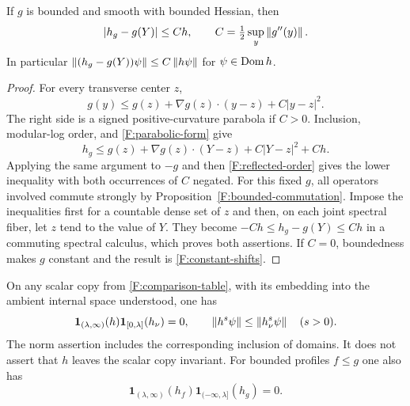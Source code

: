 \begin{lemma}\label{F:taylor-bound}
If $g$ is bounded and smooth with bounded Hessian, then
\begin{equation}\label{F:taylor-equation}
 |h_g-g(Y)|\le C h,\qquad
 C=\tfrac12\sup_y\left\lVert g''(y)\right\rVert.
\end{equation}
In particular
$\left\lVert(h_g-g(Y))\psi\right\rVert\le C\left\lVert h\psi\right\rVert$ for $\psi\in\operatorname{Dom} h$.
\end{lemma}

\begin{proof}
For every transverse center $z$,
\[
 g(y)\le g(z)+\nabla g(z)\cdot(y-z)+C|y-z|^2.
\]
The right side is a signed positive-curvature parabola if $C>0$.
Inclusion, modular-log order, and \eqref{F:parabolic-form} give
\[
 h_g\le g(z)+\nabla g(z)\cdot(Y-z)+C|Y-z|^2+Ch.
\]
Applying the same argument to $-g$ and then \eqref{F:reflected-order}
gives the lower inequality with both occurrences of $C$ negated.
For this fixed $g$, all operators involved commute strongly by
Proposition~\ref{F:bounded-commutation}. Impose the inequalities first
for a countable dense set of $z$ and then, on each joint spectral fiber,
let $z$ tend to the value of $Y$. They become
$-Ch\le h_g-g(Y)\le Ch$ in a commuting spectral calculus, which proves
both assertions. If $C=0$, boundedness makes $g$ constant and the
result is \eqref{F:constant-shifts}.
\end{proof}

\begin{proposition}\label{F:spectral-comparison}
On any scalar copy from \eqref{F:comparison-table}, with its embedding
into the ambient internal space understood, one has
\begin{equation}\label{F:spectral-equation}
 \mathbf1_{(\lambda,\infty)}(h)
       \mathbf1_{[0,\lambda]}(h_\nu)=0,\qquad
 \left\lVert h^s\psi\right\rVert\le\left\lVert h_\nu^s\psi\right\rVert\quad(s>0).
\end{equation}
The norm assertion includes the corresponding inclusion of domains.
It does not assert that $h$ leaves the scalar copy invariant.
For bounded profiles $f\le g$ one also has
\begin{equation}\label{F:bounded-spectral-order}
 \mathbf1_{(\lambda,\infty)}(h_f)
       \mathbf1_{(-\infty,\lambda]}(h_g)=0.
\end{equation}
\end{proposition}

